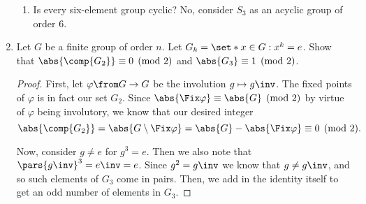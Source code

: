 \documentclass{article}
\begin{document}
\begin{enumerate}
\begin{enumerate}
          \item Is every six-element group cyclic? No, consider $S_{3}$ as an acyclic group of order 6.
        \end{enumerate}


  \item Let $G$ be a finite group of order $n$.
        Let $G_{k} = \set*{ x \in G : x^{k} = e }$.
        Show that $\abs{\comp{G_{2}}} \equiv 0 \pmod{2}$ and $\abs{G_{3}} \equiv 1 \pmod{2}$.


        \begin{proof}
            First, let $\varphi \from G \to G$ be the involution $g \mapsto g\inv$.
            The fixed points of $\varphi$ is in fact our set $G_{2}$.
            Since $\abs{\Fix \varphi} \equiv \abs{G} \pmod{2}$ by virtue of $\varphi$ being involutory,
            we know that our desired integer
            \[
              \abs{\comp{G_{2}}} = \abs{G \setminus \Fix \varphi} = \abs{G} - \abs{\Fix \varphi} \equiv 0 \pmod{2}.
            \]

            Now, consider $g \ne e$ for $g^{3} = e$. Then we also note that $\pars{g\inv}^{3} = e\inv = e$.
            Since $g^{2} = g\inv$ we know that $g \ne g\inv$, and so such elements of $G_{3}$ come in pairs.
            Then, we add in the identity itself to get an odd number of elements in $G_{3}$.
        \end{proof}

\end{enumerate}
\end{document}
